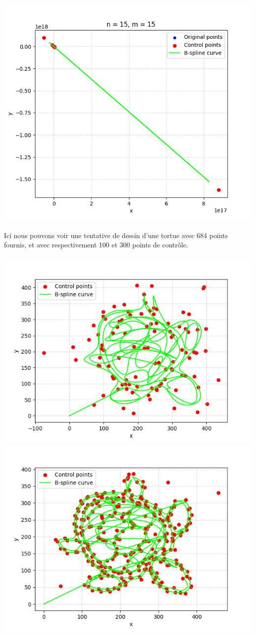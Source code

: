 \documentclass[11pt]{article}
\begin{document}
\includegraphics[scale=0.3]{images/coeur6.png}

Ici nous pouvons voir une tentative de dessin d'une tortue avec 684 points fournis, et avec respectivement 100 et 300 points de contrôle.

\includegraphics[scale=0.3]{images/turtle.png}
\includegraphics[scale=0.3]{images/turtle2.png}
\end{document}
